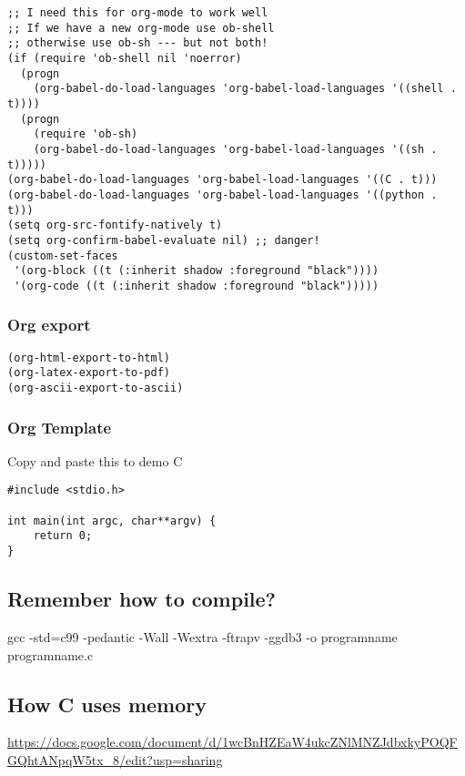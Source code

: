 \documentclass[11pt]{article}
\begin{document}
\begin{verbatim}
;; I need this for org-mode to work well
;; If we have a new org-mode use ob-shell
;; otherwise use ob-sh --- but not both!
(if (require 'ob-shell nil 'noerror)
  (progn
    (org-babel-do-load-languages 'org-babel-load-languages '((shell . t))))
  (progn
    (require 'ob-sh)
    (org-babel-do-load-languages 'org-babel-load-languages '((sh . t)))))
(org-babel-do-load-languages 'org-babel-load-languages '((C . t)))
(org-babel-do-load-languages 'org-babel-load-languages '((python . t)))
(setq org-src-fontify-natively t)
(setq org-confirm-babel-evaluate nil) ;; danger!
(custom-set-faces
 '(org-block ((t (:inherit shadow :foreground "black"))))
 '(org-code ((t (:inherit shadow :foreground "black")))))
\end{verbatim}

\subsubsection{Org export}
\label{sec:org583544c}
\begin{verbatim}
(org-html-export-to-html)
(org-latex-export-to-pdf)
(org-ascii-export-to-ascii)
\end{verbatim}


\subsubsection{Org Template}
\label{sec:orgac0b513}
Copy and paste this to demo C

\begin{verbatim}
#include <stdio.h>

int main(int argc, char**argv) {
    return 0;
}
\end{verbatim}

\subsection{Remember how to compile?}
\label{sec:org7296b47}

gcc  -std=c99 -pedantic -Wall -Wextra -ftrapv -ggdb3 -o programname programname.c


\subsection{How C uses memory}
\label{sec:orgd456d69}

\url{https://docs.google.com/document/d/1wcBnHZEaW4ukcZNlMNZJdbxkyPOQFGQhtANpqW5tx\_8/edit?usp=sharing}
\end{document}
